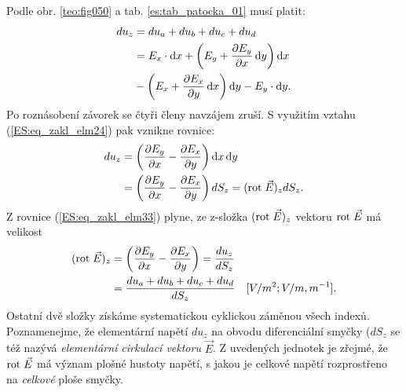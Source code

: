         Podle obr. \ref{teo:fig050} a tab. \ref{es:tab_patocka_01} musí platit:
        \begin{align}
          du_z &= du_a + du_b + du_c + du_d                                  \nonumber  \\ 
               &= E_x\cdot \mathop{}\!\mathrm{d}x + \left(E_y + \dfrac{\partial E_y}{\partial x}\mathop{}\!\mathrm{d}y\right)\mathop{}\!\mathrm{d}x         \nonumber  \\
               &- \left(E_x + \dfrac{\partial E_x}{\partial y}\mathop{}\!\mathrm{d}x\right)\mathop{}\!\mathrm{d}y  - E_y\cdot \mathop{}\!\mathrm{d}y . \label{ES:eq_zakl_elm32}
        \end{align}
        Po roznásobení závorek se čtyři členy navzájem zruší. S využitím vztahu 
        (\ref{ES:eq_zakl_elm24}) pak vznikne rovnice:
        \begin{align}
          du_z&= \left(\dfrac{\partial E_y}{\partial x} - \dfrac{\partial E_x}{\partial y}\right)\mathop{}\!\mathrm{d}x\mathop{}\!\mathrm{d}y              \nonumber \\
              &= \left(\dfrac{\partial E_y}{\partial x} - \dfrac{\partial E_x}{\partial y}\right)dS_z 
               = (\mathrm{rot}\;\vec{E})_z dS_z.                                   \label{ES:eq_zakl_elm33}
        \end{align}
        Z rovnice (\ref{ES:eq_zakl_elm33}) plyne, ze z-složka \((\mathrm{rot}\;\vec{E})_z\) vektoru \(\mathrm{rot}\;\vec{E}\) 
        má velikost
        \begin{align}
          (\mathrm{rot}\;\vec{E})_z &= \left(\dfrac{\partial E_y}{\partial x} - \dfrac{\partial E_x}{\partial y}\right)        
                       = \frac{du_z}{dS_z}                                   \nonumber  \\
                      &= \frac{du_a + du_b + du_c + du_d}{dS_z} 
                         \quad[V/m^2; V/m, m^{-1}].                    \label{ES:eq_zakl_elm34}
        \end{align}
        Ostatní dvě složky získáme systematickou cyklickou záměnou všech indexů. Poznamenejme, že 
        elementární napětí \(du_z\) na obvodu diferenciální smyčky (\(dS_z\) se též nazývá 
        \emph{elementární cirkulací vektoru} \(\vec{E}\). Z uvedených jednotek je zřejmé, že 
        \(\mathrm{rot}\;\vec{E}\) má význam plošné hustoty napětí, s jakou je celkové napětí rozprostřeno na 
        \emph{celkové} ploše smyčky.
      
